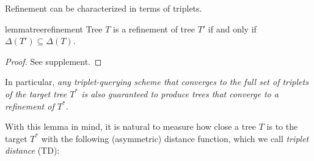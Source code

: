 Refinement can be characterized in terms of triplets.
\begin{restatable}{lemma}{treerefinement}
\label{thm:treerefinement}
Tree $T$ is a refinement of tree $T'$ if and only if $\Delta(T') \subseteq \Delta(T)$.
\end{restatable}
\begin{proof}
See supplement.
\end{proof}
In particular, {\it any triplet-querying scheme that converges to the full set of triplets of the target tree $T^*$ is also guaranteed to produce trees that converge to a refinement of $T^*$.}

With this lemma in mind, it is natural to measure how close a tree $T$ is to the target $T^*$ with the following (asymmetric) distance function, which we call {\it triplet distance} (TD):






